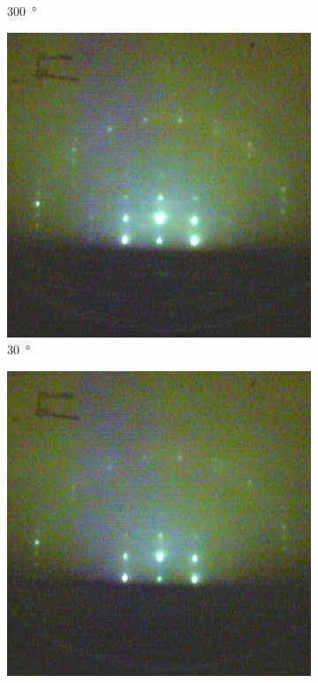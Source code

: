 \begin{figure}
\begin{subfigure}{0.2\linewidth}
        \caption{\qty{300}{\degree}}
    \end{subfigure}
    \begin{subfigure}{0.2\linewidth}
        \includegraphics[width=\textwidth]{../data/edited/2_2_53deg.pdf}
        \caption{\qty{30}{\degree}}
    \end{subfigure}
    \begin{subfigure}{0.2\linewidth}
        \includegraphics[width=\textwidth]{../data/edited/2_2_113deg.pdf}

\end{subfigure}
\end{figure}
